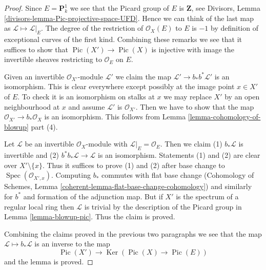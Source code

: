 \documentclass[10pt,a4paper]{amsart}
\theoremstyle{plain}
\theoremstyle{definition}
\theoremstyle{remark}
\numberwithin{equation}{subsection}
\def\Spec{\mathop{\mathrm{Spec}}}
\def\Ker{\mathop{\mathrm{Ker}}}
\def\Pic{\mathop{\mathrm{Pic}}\nolimits}
\begin{document}
\begin{proof}
Since $E = \mathbf{P}^1_k$ we see that the Picard group of $E$
is $\mathbf{Z}$, see Divisors, Lemma
\ref{divisors-lemma-Pic-projective-space-UFD}.
Hence we can think of the last map as $\mathcal{L} \mapsto \mathcal{L}|_E$.
The degree of the restriction of $\mathcal{O}_X(E)$ to $E$ is $-1$
by definition of exceptional curves of the first kind. Combining these
remarks we see that it
suffices to show that $\Pic(X') \to \Pic(X)$ is injective
with image the invertible sheaves restricting to $\mathcal{O}_E$ on $E$.

\medskip\noindent
Given an invertible $\mathcal{O}_{X'}$-module
$\mathcal{L}'$ we claim the map $\mathcal{L}' \to b_*b^*\mathcal{L}'$
is an isomorphism. This is clear everywhere except possibly at the image
point $x \in X'$ of $E$. To check it is an isomorphism on stalks
at $x$ we may replace $X'$ by an open neighbourhood at $x$ and
assume $\mathcal{L}'$ is $\mathcal{O}_{X'}$. Then we have to
show that the map $\mathcal{O}_{X'} \to b_*\mathcal{O}_X$
is an isomorphism. This follows from Lemma \ref{lemma-cohomology-of-blowup}
part (4).

\medskip\noindent
Let $\mathcal{L}$ be an invertible $\mathcal{O}_X$-module with
$\mathcal{L}|_E = \mathcal{O}_E$. Then we claim 
(1) $b_*\mathcal{L}$ is invertible and
(2) $b^*b_*\mathcal{L} \to \mathcal{L}$ is an isomorphism.
Statements (1) and (2) are clear over $X' \setminus \{x\}$.
Thus it suffices to prove (1) and (2) after base change
to $\Spec(\mathcal{O}_{X', x})$.
Computing $b_*$ commutes with flat base change
(Cohomology of Schemes, Lemma \ref{coherent-lemma-flat-base-change-cohomology})
and similarly for $b^*$ and formation of the adjunction map.
But if $X'$ is the spectrum of a regular local ring
then $\mathcal{L}$ is trivial by the description of
the Picard group in Lemma \ref{lemma-blowup-pic}. Thus
the claim is proved.

\medskip\noindent
Combining the claims proved in the previous two paragraphs we
see that the map $\mathcal{L} \mapsto b_*\mathcal{L}$
is an inverse to the map
$$
\Pic(X') \longrightarrow \Ker(\Pic(X) \to \Pic(E))
$$
and the lemma is proved.
\end{proof}
\end{document}
